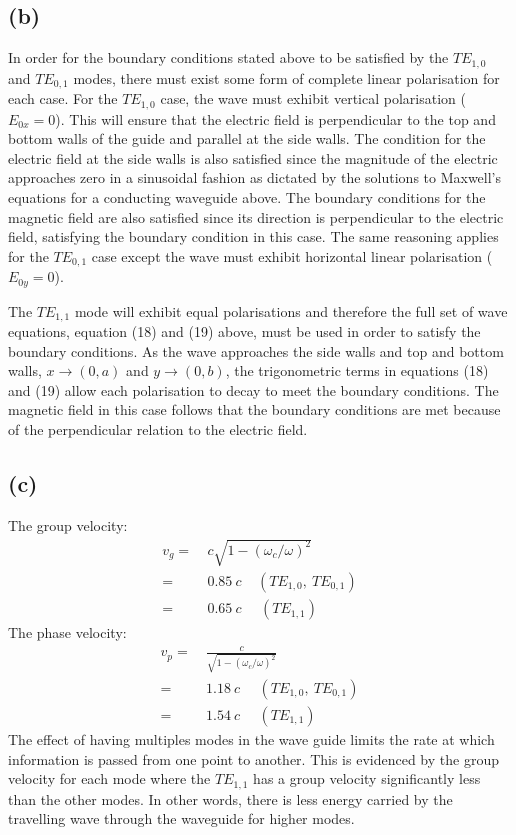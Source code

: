 \documentclass[8pt,a4paper,oneside]{article}
\begin{document}
\subsection*{(b)}
In order for the boundary conditions stated above to be satisfied by the $TE_{1,0}$ and $TE_{0,1}$ modes, there must exist some form of complete linear polarisation for each case. For the $TE_{1,0}$ case, the wave must exhibit vertical polarisation ($E_{0x} = 0$). This will ensure that the electric field is perpendicular to the top and bottom walls of the guide and parallel at the side walls. The condition for the electric field at the side walls is also satisfied since the magnitude of the electric approaches zero in a sinusoidal fashion as dictated by the solutions to Maxwell's equations for a conducting waveguide above. The boundary conditions for the magnetic field are also satisfied since its direction is perpendicular to the electric field, satisfying the boundary condition in this case. The same reasoning applies for the $TE_{0,1}$ case except the wave must exhibit horizontal linear polarisation ($E_{0y} = 0$). 

The $TE_{1,1}$ mode will exhibit equal polarisations and therefore the full set of wave equations, equation (18) and (19) above, must be used in order to satisfy the boundary conditions. As the wave approaches the side walls and top and bottom walls, $x \rightarrow (0, a)$ and $y \rightarrow (0,b)$, the trigonometric terms in equations (18) and (19) allow each polarisation to decay to meet the boundary conditions. The magnetic field in this case follows that the boundary conditions are met because of the perpendicular relation to the electric field. 

\subsection*{(c)}
The group velocity:
\begin{align}
	v_g =&~ c \sqrt{1 - (\omega_c / \omega)^2}\\
	=&~ 0.85~c ~~~~~(TE_{1,0},~ TE_{0,1})\\
	=&~0.65~c ~~~~~~(TE_{1,1})
\end{align}
The phase velocity:
\begin{align}
	v_p =&~ \frac{c}{\sqrt{1 - (\omega_c / \omega)^2}}\\
	=&~1.18~c ~~~~~~(TE_{1,0},~ TE_{0,1})\\
	=&~1.54~c~~~~~~(TE_{1,1})
\end{align}
The effect of having multiples modes in the wave guide limits the rate at which information is passed from one point to another. This is evidenced by the group velocity for each mode where the $TE_{1,1}$ has a group velocity significantly less than the other modes. In other words, there is less energy carried by the travelling wave through the waveguide for higher modes. 
\end{document}
